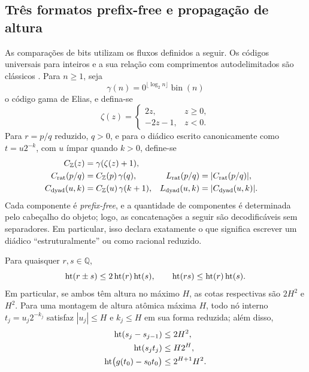 \subsection{Três formatos prefix-free e propagação de altura}
\label{artigo_2:subsec:coding-formats}

As comparações de bits utilizam os fluxos definidos a seguir. Os códigos universais para inteiros e a sua relação
com comprimentos autodelimitados são clássicos
\citep{artigo_1-elias1975,artigo_1-cover2006}. Para $n\ge1$, seja
\[
 \gamma(n)=0^{\lfloor\log_2n\rfloor}\operatorname{bin}(n)
\]
o código gama de Elias, e defina-se
\[
 \zeta(z)=\begin{cases}2z,&z\ge0,\\-2z-1,&z<0.
 \end{cases}
\]
Para $r=p/q$ reduzido, $q>0$, e para o diádico escrito canonicamente como
$t=u2^{-k}$, com $u$ ímpar quando $k>0$, define-se
\begin{align}
 C_{\mathbb Z}(z)&=\gamma(\zeta(z)+1),\\
 C_{\rm rat}(p/q)&=C_{\mathbb Z}(p)\,\gamma(q),
 &L_{\rm rat}(p/q)&=|C_{\rm rat}(p/q)|,\label{artigo_2:eq:rational-code}\\
 C_{\rm dyad}(u,k)&=C_{\mathbb Z}(u)\,\gamma(k+1),
 &L_{\rm dyad}(u,k)&=|C_{\rm dyad}(u,k)|.
 \label{artigo_2:eq:dyadic-code}
\end{align}
Cada componente é \emph{prefix-free}, e a quantidade de componentes é determinada
pelo cabeçalho do objeto; logo, as concatenações a seguir são decodificáveis sem
separadores. Em particular, isso declara exatamente o que significa escrever
um diádico ``estruturalmente'' ou como racional reduzido.

\begin{lemma}\label{map:artigo_2:3.11}
\label{artigo_2:lem:height-arithmetic}
Para quaisquer $r,s\in\mathbb Q$,
\begin{equation}
 \operatorname{ht}(r\pm s)\le2\operatorname{ht}(r)\operatorname{ht}(s),
 \qquad
 \operatorname{ht}(rs)\le\operatorname{ht}(r)\operatorname{ht}(s).
 \label{artigo_2:eq:height-arithmetic}
\end{equation}
Em particular, se ambos têm altura no máximo $H$, as cotas respectivas são
$2H^2$ e $H^2$.
Para uma montagem de altura atômica máxima $H$, todo nó interno
$t_j=u_j2^{-k_j}$ satisfaz $|u_j|\le H$ e $k_j\le H$ em sua forma reduzida;
além disso,
\begin{align}
 \operatorname{ht}(s_j-s_{j-1})&\le2H^2,\label{artigo_2:eq:slope-jump-height}\\
 \operatorname{ht}(s_jt_j)&\le H2^H,\label{artigo_2:eq:slope-knot-height}\\
 \operatorname{ht}\bigl(g(t_0)-s_0t_0\bigr)&\le2^{H+1}H^2.
 \label{artigo_2:eq:intercept-height}
\end{align}
\end{lemma}

